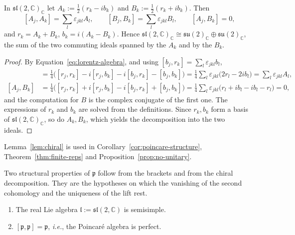 \begin{lemma}\label{lem:chiral}
	In $\mathfrak{sl}(2,\mathbb{C})_{\mathbb{C}}$ let $A_k:=\frac12(r_k-ib_k)$ and $B_k:=\frac12(r_k+ib_k)$. Then
	\begin{equation}\label{eq:chiral-brackets}
		[A_j,A_k]=\sum_l\varepsilon_{jkl}A_l, \qquad [B_j,B_k]=\sum_l\varepsilon_{jkl}B_l, \qquad [A_j,B_k]=0,
	\end{equation}
	and $r_k=A_k+B_k$, $b_k=i(A_k-B_k)$. Hence $\mathfrak{sl}(2,\mathbb{C})_{\mathbb{C}}\cong\mathfrak{su}(2)_{\mathbb{C}}\oplus\mathfrak{su}(2)_{\mathbb{C}}$, the sum of the two commuting ideals spanned by the $A_k$ and by the $B_k$.
\end{lemma}

\begin{proof}
	By Equation~\eqref{eq:lorentz-algebra}, and using $[b_j,r_k]=\sum_l\varepsilon_{jkl}b_l$,
	\begin{align*}
		[A_j,A_k]&=\tfrac14\big([r_j,r_k]-i[r_j,b_k]-i[b_j,r_k]-[b_j,b_k]\big)=\tfrac14\sum_l\varepsilon_{jkl}\big(2r_l-2ib_l\big)=\sum_l\varepsilon_{jkl}A_l,\\
		[A_j,B_k]&=\tfrac14\big([r_j,r_k]+i[r_j,b_k]-i[b_j,r_k]+[b_j,b_k]\big)=\tfrac14\sum_l\varepsilon_{jkl}\big(r_l+ib_l-ib_l-r_l\big)=0,
	\end{align*}
	and the computation for $B$ is the complex conjugate of the first one. The expressions of $r_k$ and $b_k$ are solved from the definitions. Since $r_k,b_k$ form a basis of $\mathfrak{sl}(2,\mathbb{C})_{\mathbb{C}}$, so do $A_k,B_k$, which yields the decomposition into the two ideals.
\end{proof}

\noindent Lemma~\ref{lem:chiral} is used in Corollary~\ref{cor:poincare-structure}, Theorem~\ref{thm:finite-reps} and Proposition~\ref{prop:no-unitary}.

Two structural properties of $\mathfrak{p}$ follow from the brackets and from the chiral decomposition. They are the hypotheses on which the vanishing of the second cohomology and the uniqueness of the lift rest.

\begin{corollary}\label{cor:poincare-structure}
	\begin{enumerate}
		\item The real Lie algebra $\mathfrak{l}:=\mathfrak{sl}(2,\mathbb{C})$ is semisimple.
		\item $[\mathfrak{p},\mathfrak{p}]=\mathfrak{p}$, \textit{i.e.}, the Poincar\'e algebra is perfect.
	\end{enumerate}
\end{corollary}

